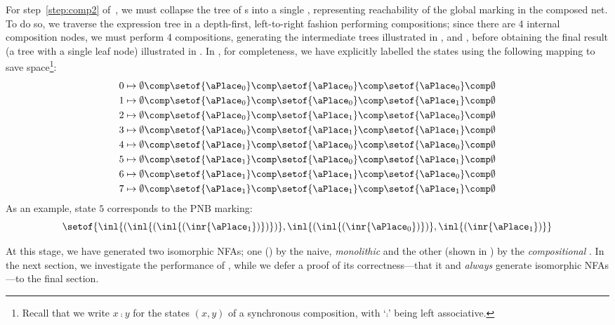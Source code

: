 For step~\ref{step:comp2} of~, we must
collapse the tree of \TNFA{}s into a single \TNFA{}, representing reachability
of the global marking in the composed net. To do so, we traverse the expression
tree in a depth-first, left-to-right fashion performing compositions; since
there are 4 internal composition nodes, we must perform 4 \TNFA{} compositions,
generating the intermediate trees illustrated in ,
 and , before obtaining the
final result (a tree with a single leaf node) illustrated in
. In , for completeness, we
have explicitly labelled the \TNFA{} states using the following
mapping to save space\footnote{Recall that we write $x \comp y$ for the states
$(x,y)$ of a synchronous composition, with `$\comp$' being left associative.}:
\newcommand{\mto}[4]{#1 &\mapsto \emptyset \comp \setof{\aPlace_#2} \comp
    \setof{\aPlace_#3} \comp \setof{\aPlace_#4} \comp
\emptyset}
\begin{align*}
    \mto{0}{0}{0}{0}\\
    \mto{1}{0}{0}{1}\\
    \mto{2}{0}{1}{0}\\
    \mto{3}{0}{1}{1}\\
    \mto{4}{1}{0}{0}\\
    \mto{5}{1}{0}{1}\\
    \mto{6}{1}{1}{0}\\
    \mto{7}{1}{1}{1}
\end{align*}
As an example, state $5$ corresponds to the PNB marking:
\[
    \setof{\inl{(\inl{(\inl{(\inr{\aPlace_1})})})},
           \inl{(\inl{(\inr{\aPlace_0})})},
           \inl{(\inr{\aPlace_1})}}
\]

At this stage, we have generated two isomorphic NFAs; one
() by the naive, \emph{monolithic}
 and the other (shown in )
by the \emph{compositional} . In the next
section, we investigate the performance of ,
while we defer a proof of its correctness---that it and
 \emph{always} generate isomorphic NFAs---to the
final section.

